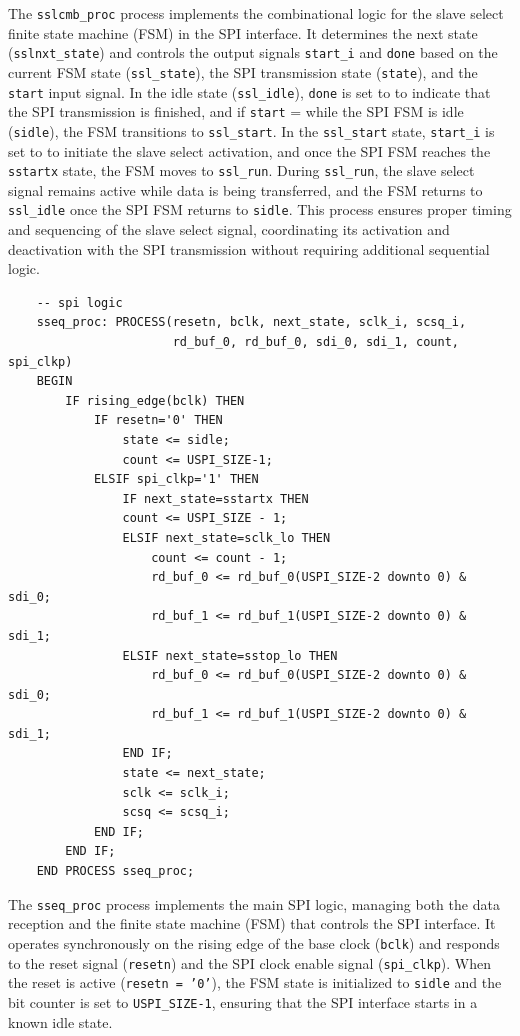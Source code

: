 The \texttt{sslcmb\_proc} process implements the combinational logic for the slave select finite state machine (FSM) in the SPI interface. It determines the next state (\texttt{sslnxt\_state}) and controls the output signals \texttt{start\_i} and \texttt{done} based on the current FSM state (\texttt{ssl\_state}), the SPI transmission state (\texttt{state}), and the \texttt{start} input signal. In the idle state (\texttt{ssl\_idle}), \texttt{done} is set to \textquotesingle{} to indicate that the SPI transmission is finished, and if \texttt{start} = \textquotesingle{} while the SPI FSM is idle (\texttt{sidle}), the FSM transitions to \texttt{ssl\_start}. In the \texttt{ssl\_start} state, \texttt{start\_i} is set to \textquotesingle{} to initiate the slave select activation, and once the SPI FSM reaches the \texttt{sstartx} state, the FSM moves to \texttt{ssl\_run}. During \texttt{ssl\_run}, the slave select signal remains active while data is being transferred, and the FSM returns to \texttt{ssl\_idle} once the SPI FSM returns to \texttt{sidle}. This process ensures proper timing and sequencing of the slave select signal, coordinating its activation and deactivation with the SPI transmission without requiring additional sequential logic.



\begin{verbatim}
	-- spi logic
	sseq_proc: PROCESS(resetn, bclk, next_state, sclk_i, scsq_i,
				       rd_buf_0, rd_buf_0, sdi_0, sdi_1, count, spi_clkp)
	BEGIN
		IF rising_edge(bclk) THEN
			IF resetn='0' THEN
				state <= sidle;
				count <= USPI_SIZE-1;
			ELSIF spi_clkp='1' THEN
				IF next_state=sstartx THEN
                count <= USPI_SIZE - 1;
                ELSIF next_state=sclk_lo THEN
                    count <= count - 1;
                    rd_buf_0 <= rd_buf_0(USPI_SIZE-2 downto 0) & sdi_0;
                    rd_buf_1 <= rd_buf_1(USPI_SIZE-2 downto 0) & sdi_1;
                ELSIF next_state=sstop_lo THEN
                    rd_buf_0 <= rd_buf_0(USPI_SIZE-2 downto 0) & sdi_0;
                    rd_buf_1 <= rd_buf_1(USPI_SIZE-2 downto 0) & sdi_1;
                END IF;
                state <= next_state;
                sclk <= sclk_i;
                scsq <= scsq_i;
			END IF;
		END IF;
	END PROCESS sseq_proc;
\end{verbatim}

The \texttt{sseq\_proc} process implements the main SPI logic, managing both the data reception and the finite state machine (FSM) that controls the SPI interface. It operates synchronously on the rising edge of the base clock (\texttt{bclk}) and responds to the reset signal (\texttt{resetn}) and the SPI clock enable signal (\texttt{spi\_clkp}). When the reset is active (\texttt{resetn = '0'}), the FSM state is initialized to \texttt{sidle} and the bit counter is set to \texttt{USPI\_SIZE-1}, ensuring that the SPI interface starts in a known idle state.

